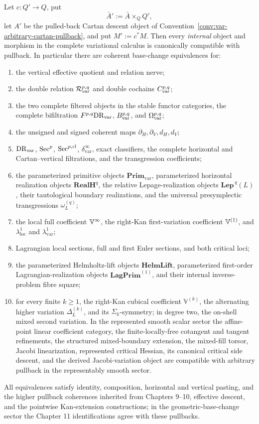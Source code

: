 \begin{theorem}
\label{thm:var-base-change}
Let \(c:Q'\to Q\), put
\[
    \bar A':=\bar A\times_QQ',
\]
let \(A'\) be the pulled-back Cartan descent object of Convention~\ref{conv:var-arbitrary-cartan-pullback}, and put \(M':=c^*M\). Then every \emph{internal} object and morphism in the complete variational calculus is canonically compatible with pullback. In particular there are coherent base-change equivalences for:
\begin{enumerate}
\item the vertical effective quotient and relation nerve;
\item the double relation \(\mathcal R_{\mathrm{var}}^{p,q}\) and double cochains \(C_{\mathrm{var}}^{p,q}\);
\item the two complete filtered objects in the stable functor categories, the complete bifiltration \(F^{p,q}\mathrm{DR}_{\mathrm{var}}\), \(B_{\mathrm{var}}^{p,q}\), and \(\Omega_{\mathrm{var}}^{p,q}\);
\item the unsigned and signed coherent maps \(\partial_H,\partial_V,d_H,d_V\);
\item \(\mathrm{DR}_{\mathrm{var}}\), \(\operatorname{Sec}^p\), \(\operatorname{Sec}^{p,\mathrm{cl}}\), \(\delta^{\infty}_{\mathrm{var}}\), exact classifiers, the complete horizontal and Cartan--vertical filtrations, and the transgression coefficients;
\item the parameterized primitive objects \(\mathbf{Prim}_{\mathrm{var}}\), parameterized horizontal realization objects \(\mathbf{RealH}^q\), the relative Lepage-realization objects \(\mathbf{Lep}^{\,q}(L)\), their tautological boundary realizations, and the universal presymplectic transgressions \(\omega_L^{(q)}\);
\item the local full coefficient \(\mathbb V^{\infty}\), the right-Kan first-variation coefficient \(\mathbb V^{(1)}\), and \(\lambda^1_{\mathrm{loc}}\) and \(\lambda^1_{\mathrm{var}}\);
\item Lagrangian local sections, full and first Euler sections, and both critical loci;
\item the parameterized Helmholtz-lift objects \(\mathbf{HelmLift}\), parameterized first-order Lagrangian-realization objects \(\mathbf{LagPrim}^{(1)}\), and their internal inverse-problem fibre square;
\item for every finite \(k\ge1\), the right-Kan cubical coefficient \(\mathbb V^{(k)}\), the alternating higher variation \(\Delta_L^{(k)}\), and its \(\Sigma_k\)-symmetry; in degree two, the on-shell mixed second variation.  In the represented smooth scalar sector the affine-point linear coefficient category, the finite-locally-free cotangent and tangent refinements, the structured mixed-boundary extension, the mixed-fill torsor, Jacobi linearization, represented critical Hessian, its canonical critical side descent, and the derived Jacobi-variation object are compatible with arbitrary pullback in the representably smooth sector.
\end{enumerate}
All equivalences satisfy identity, composition, horizontal and vertical pasting, and the higher pullback coherences inherited from Chapters 9--10, effective descent, and the pointwise Kan-extension constructions; in the geometric-base-change sector the Chapter 11 identifications agree with these pullbacks.


\end{theorem}
